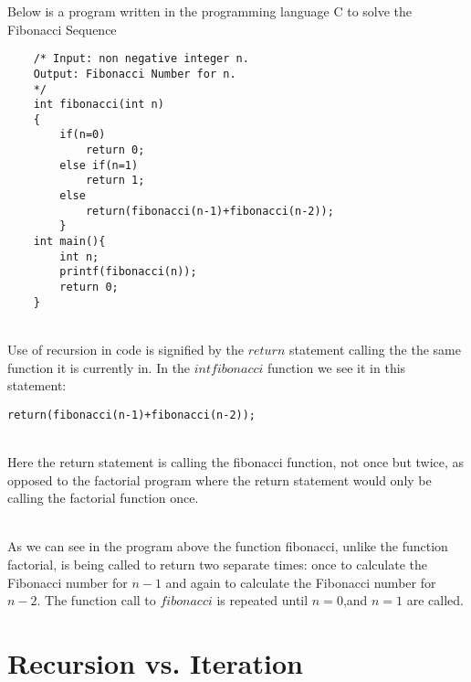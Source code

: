 \documentclass{article}
\begin{document}
Below is a program written in the programming language C to solve the Fibonacci Sequence 
\\
\begin{lstlisting}
	/* Input: non negative integer n.
	Output: Fibonacci Number for n.
	*/
	int fibonacci(int n)
	{
		if(n=0)
			return 0;
		else if(n=1)
			return 1;
		else
			return(fibonacci(n-1)+fibonacci(n-2));
		}
	int main(){
		int n;
		printf(fibonacci(n));
		return 0;
	}

\end{lstlisting}
~\\
Use of recursion in code is signified by the $return$ statement calling the the same function it is currently in. In the $int fibonacci$ function we see it in this statement:
\\
\begin{lstlisting}
return(fibonacci(n-1)+fibonacci(n-2));
\end{lstlisting}
~\\
Here the return statement is calling the fibonacci function, not once but twice, as opposed to the factorial program where the return statement would only be calling the factorial function once.  
	
\begin{comment}
n=4
f(3)f(2)
f(
\end{comment}
~\\
As we can see in the program above the function fibonacci, unlike the function factorial, is being called to return two separate times: once to calculate the Fibonacci number for $n-1$ and again to calculate the Fibonacci number for $n-2$.  The function call to $fibonacci$ is repeated until $n=0$,and $n=1$ are called.
\section{Recursion vs. Iteration}
\end{document}
